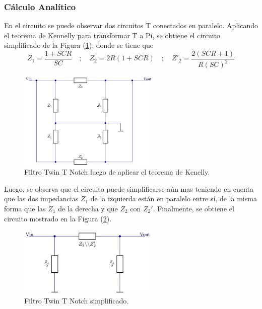\documentclass[a4paper]{article}
\begin{document}
\subsubsection{Cálculo Analítico}
En el circuito se puede observar dos circuitos T conectados en paralelo. Aplicando el teorema de Kennelly para transformar T a Pi, se obtiene el circuito simplificado de la Figura (\ref{fig:filtrosimplificado}), donde se tiene que
\[Z_1=\frac{1+SCR}{SC}\hspace{1em};\hspace{1em} Z_2=2R(1+SCR) \hspace{1em};\hspace{1em} Z'_2=\frac{2(SCR+1)}{R(SC)^2}\]

\begin{figure}[H]
	\centering
	\includegraphics[width=0.6\textwidth, trim={0 0.1cm  0 0},clip]{ej1kennellly.jpg}
\caption{Filtro Twin T Notch luego de aplicar el teorema de Kenelly.}
	\label{fig:filtrosimplificado}
\end{figure}

Luego, se observa que el circuito puede simplificarse aún mas teniendo en cuenta que las dos impedancias $Z_1$ de la izquierda están en paralelo entre sí, de la misma forma que las $Z_1$ de la derecha y que $Z_2$ con $Z_2'$. Finalmente, se obtiene el circuito mostrado en la Figura (\ref{fig:filtrofinal}).

\begin{figure}[H]
	\centering
	\includegraphics[width=0.6\textwidth]{ej1simplificado.jpg}
\caption{Filtro Twin T Notch simplificado.}
	\label{fig:filtrofinal}
\end{figure}
\end{document}
